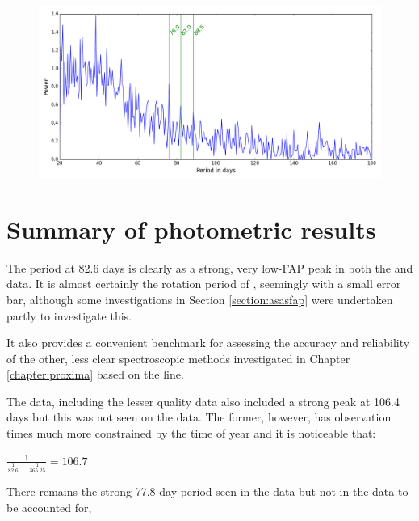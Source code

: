 
\begin{figure}[!htbp]
\begin{center}
\includegraphics[scale=0.50]{Figures/hstwinfunc.png} \\
\end{center}
\caption{}
\protect\label{fig:hstwf}
\end{figure}

\section{Summary of photometric results}
\protect\label{section:summphotometric}

The period at 82.6 days is clearly as a strong, very low-FAP peak in both the {\asas} and {\hst} data. It is almost
certainly the rotation period of {\prox}, seemingly with a small error bar, although some investigations in Section
\ref{section:asasfap} were undertaken partly to investigate this.

It also provides a convenient benchmark for assessing the accuracy and reliability of the other, less clear
spectroscopic methods investigated in Chapter \ref{chapter:proxima} based on the {\ha} line.

The {\asas} data, including the lesser quality data also included a strong peak at 106.4 days but this was not seen on
the {\hst} data. The former, however, has observation times much more constrained by the time of year and it is
noticeable that:

\begin{center}

$ \frac{1}{\frac{1}{82.6} - \frac{1}{365.25}} = 106.7 $

\end{center}

There remains the strong 77.8-day period seen in the {\hst} data but not in the {\asas} data to be accounted for,
